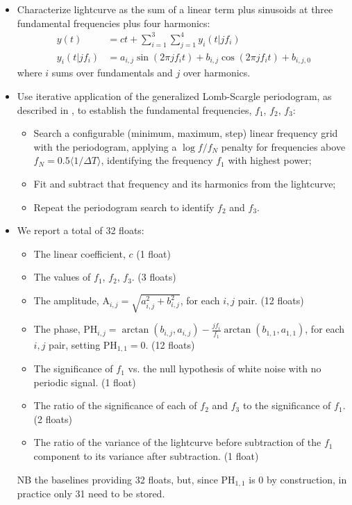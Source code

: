 \begin{itemize}

\item{Characterize lightcurve as the sum of a linear term plus sinusoids at three fundamental frequencies plus four harmonics:
\begin{align}
y(t) &= ct + \sum_{i=1}^{3} \sum_{j=1}^{4} y_i(t|j f_i) \\
y_i(t|j f_i) &= a_{i,j} \sin(2 \pi j f_i t) + b_{i, j} \cos(2 \pi j f_i t) + b_{i, j, 0}
\end{align}
where $i$ sums over fundamentals and $j$ over harmonics.
}
\item{Use iterative application of the generalized Lomb-Scargle periodogram, as described in \cite{2011ApJ...733...10R}, to establish the fundamental frequencies, $f_1$, $f_2$, $f_3$:
\begin{itemize}
  \item{Search a configurable (minimum, maximum, step) linear frequency grid with the periodogram, applying a $\log f/f_N$ penalty for frequencies above $f_N = 0.5 \langle 1 / \Delta T \rangle$, identifying the frequency $f_1$ with highest power;}
  \item{Fit and subtract that frequency and its harmonics from the lightcurve;}
  \item{Repeat the periodogram search to identify $f_2$ and $f_3$.}
\end{itemize}
}
\item{We report a total of 32 floats:
  \begin{itemize}
  \item{The linear coefficient, $c$ (1 float)}
  \item{The values of $f_1$, $f_2$, $f_3$. (3 floats)}
  \item{The amplitude, $\mathrm{A}_{i, j} = \sqrt{a_{i, j}^2 + b_{i, j}^2}$, for each $i, j$ pair. (12 floats)}
  \item{The phase, $\mathrm{PH}_{i, j} = \arctan(b_{i, j}, a_{i, j}) - \frac{j f_i}{f_1} \arctan(b_{1,1}, a_{1,1})$, for each $i, j$ pair, setting $\mathrm{PH}_{1, 1} = 0$. (12 floats)}
  \item{The significance of $f_1$ vs. the null hypothesis of white noise with no periodic signal. (1 float)}
  \item{The ratio of the significance of each of $f_2$ and $f_3$ to the significance of $f_1$. (2 floats)}
  \item{The ratio of the variance of the lightcurve before subtraction of the $f_1$ component to its variance after subtraction. (1 float)}
  \end{itemize}
NB the \DPDD{} baselines providing 32 floats, but, since $\mathrm{PH}_{1,1}$ is 0 by construction, in practice only 31 need to be stored.
}
\end{itemize}

